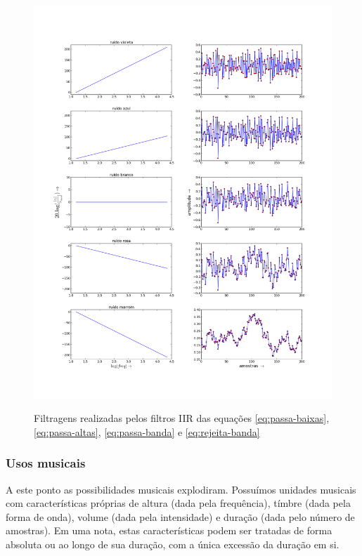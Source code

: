 \begin{figure}[h!]
    \centering
    \caption{Filtragens realizadas pelos filtros IIR das equações \ref{eq:passa-baixas}, \ref{eq:passa-altas}, \ref{eq:passa-banda} e \ref{eq:rejeita-banda}}
        \includegraphics[width=\textwidth]{figuras/ruidos___}
        \label{fig:ruidos}
\end{figure}


\subsubsection{Usos musicais}
A este ponto as possibilidades musicais explodiram. Possuímos unidades
musicais com características próprias de altura (dada pela frequência),
tímbre (dada pela forma de onda),
volume (dada pela intensidade) e duração (dada pelo número de amostras).
Em uma nota, estas características podem ser tratadas
de forma absoluta ou ao longo de sua duração,
com a única excessão da duração em si.

